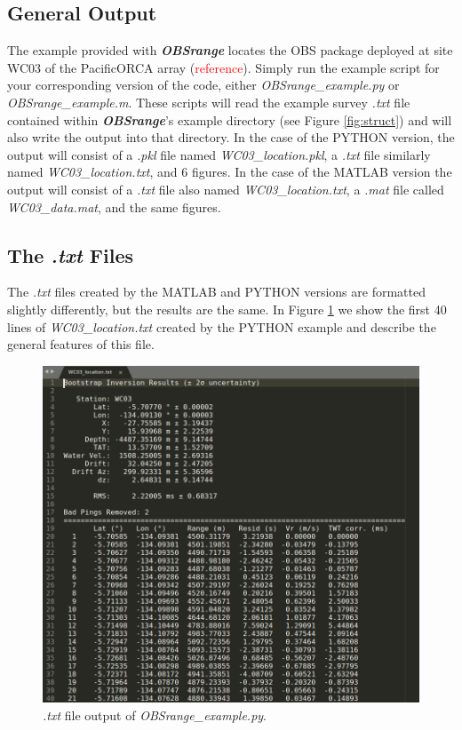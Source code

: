 \documentclass[titlepage, 12pt]{article}
\begin{document}
  \subsection{General Output}
  The example provided with \textbf{\textit{OBSrange}} locates the OBS package deployed at site WC03 of the PacificORCA array (\textcolor{red}{reference}). Simply run the example script for your corresponding version of the code, either \textit{OBSrange\_example.py} or \textit{OBSrange\_example.m}. These scripts will read the example survey \textit{.txt} file contained within \textbf{\textit{OBSrange}}'s  example directory (see Figure \ref{fig:struct}) and will also write the output into that directory.  In the case of the PYTHON version, the output will consist of a \textit{.pkl} file named \textit{WC03\_location.pkl}, a \textit{.txt} file similarly named \textit{WC03\_location.txt}, and 6 figures. In the case of the MATLAB version the output will consist of a \textit{.txt} file also named \textit{WC03\_location.txt}, a \textit{.mat} file called \textit{WC03\_data.mat}, and the same figures.

  \subsection{The \textit{.txt} Files}
  The \textit{.txt} files created by the MATLAB and PYTHON versions are formatted slightly differently, but the results are the same. In Figure \ref{fig:ex} we show the first 40 lines of \textit{WC03\_location.txt} created by the PYTHON example and describe the general features of this file.\\

  \begin{figure}[h]
   \includegraphics[width=\linewidth]{example_txt_fle.png}
   \caption{\textit{.txt} file output of \textit{OBSrange\_example.py}.}
   \label{fig:ex}
  \end{figure}
\end{document}
